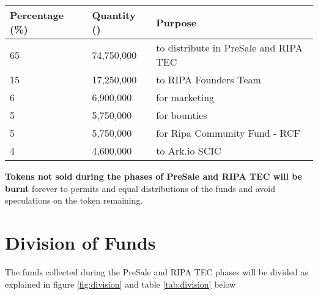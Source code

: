 \documentclass[11pt,fleqn,oneside]{book} %
\begin{document}
\vspace{5mm}
	\label{fig:distribution}

\vspace{5mm}
\begin{table}[H]
	\centering
	\begin{tabular}{l l l}
		\toprule
		\textbf{Percentage (\%)} & \textbf{Quantity (\PHP)} & \textbf{Purpose} \\
		\midrule
		65		& 74,750,000	& to distribute in PreSale and RIPA TEC	\\
		15      & 17,250,000	& to RIPA Founders Team	\\
		6       & 6,900,000		& for marketing	\\
		5       & 5,750,000 	& for bounties	\\
		5       & 5,750,000		& for Ripa Community Fund - RCF	\\
		4       & 4,600,000		& to Ark.io SCIC \\
		\bottomrule
	\end{tabular}
	\label{tab:distribution}
\end{table}

\vspace{5mm}
\textbf{Tokens not sold during the phases of PreSale and RIPA TEC will be burnt} forever to permits and equal distributions 
of the funds and avoid speculations on the token remaining.

\section{Division of Funds}
The funds collected during the PreSale and RIPA TEC phases will be divided as explained in figure \ref{fig:division} and 
table \ref{tab:division} below

\vspace{5mm}
\label{fig:division}
\end{document}
